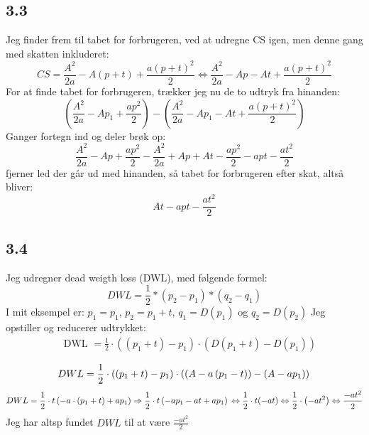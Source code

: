 \documentclass{article}
\begin{document}
\subsection*{3.3}
Jeg finder frem til tabet for forbrugeren, ved at udregne CS igen, men denne gang med skatten inkluderet:
\begin{equation}
    CS=\frac{A^2}{2 a}-A( p+t)+\frac{a (p+t)^2}{2} \Leftrightarrow \frac{A^2}{2 a}-Ap-At+\frac{a (p+t)^2}{2} 
\end{equation}
For at finde tabet for forbrugeren, trækker jeg nu de to udtryk fra hinanden:
\begin{equation}
    \left(\frac{A^2}{2 a}-A p_1+\frac{a p^2}{2}\right)-\left(\frac{A^2}{2 a}-A p_1-A t+\frac{a\left(p+t\right)^2}{2}\right)
\end{equation}
Ganger fortegn ind og deler brøk op:
\begin{equation}
    \frac{A^2}{2a}-Ap+\frac{ap^2}{2}-\frac{A^2}{2a}+Ap+At-\frac{ap^2}{2}-apt-\frac{at^2}{2}
\end{equation}
fjerner led der går ud med hinanden, så tabet for forbrugeren efter skat, altså bliver:
\begin{equation}
    At-apt-\frac{at^2}{2}
\end{equation}
\subsection*{3.4}
Jeg udregner dead weigth loss (DWL), med følgende formel:
\begin{equation}
    DWL=\frac{1}{2}*(p_2-p_1)*(q_2-q_1)
\end{equation}
I mit eksempel er: $p_1=p_1$, $p_2=p_1+t$, $q_1=D(p_1)$ og $q_2=D(p_2)$
Jeg opstiller og reducerer udtrykket:
\begin{equation}
\begin{aligned}
& \text { DWL }=\frac{1}{2} \cdot\left(\left(p_1+t\right)-p_1\right) \cdot\left(D\left(p_1+t\right)-D\left(p_1\right)\right) \\
\end{aligned}
\end{equation}
\begin{equation}
    DWL=\frac{1}{2} \cdot\left(\left(p_1+t\right)-p_1\right) \cdot\left(\left(A-a\left(p_1-t\right)\right)-\left(A-a p_1\right)\right) \\
\end{equation}
\begin{equation}
    DWL= \frac{1}{2} \cdot t\left(-a \cdot\left(p_1+t\right)+a p_1\right) \Rightarrow \frac{1}{2} \cdot t\left(-a p_1-a t+a p_1\right) \\
 \Leftrightarrow \frac{1}{2} \cdot t(-a t) \Leftrightarrow \frac{1}{2} \cdot\left(-a t^2\right) \Leftrightarrow \frac{-a t^2}{2}
\end{equation}
Jeg har altsp fundet $DWL$ til at være $\frac{-at^2}{2}$
\end{document}
